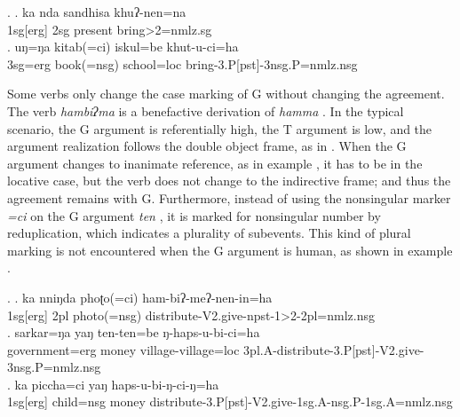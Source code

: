  \ex. \ag. ka nda sandhisa khuʔ-nen=na\\
{\sc 1sg[erg]}  {\sc 2sg}  present{\sc }	bring{>2=nmlz.sg}\\
 	\bg. uŋ=ŋa  kitab(=ci) iskul=be khut-u-ci=ha\\
		 {\sc 3sg=erg}  book{\sc (=nsg)} school{\sc =loc} bring{\sc -3.P[pst]-3nsg.P=nmlz.nsg}\\

	
Some verbs only change  the case marking of G without changing the agreement.  The verb \emph{hambiʔma}  is a benefactive derivation of \emph{hamma} . In the typical scenario, the G argument is referentially high, the T argument is low, and the argument realization follows the double object frame, as in \Next[a]. When the G argument changes to  inanimate reference, as in example \Next[b], it has to  be in the locative case, but the verb does not change to the indirective frame; and thus the agreement remains with G. Furthermore, instead of using the nonsingular marker \emph{=ci} on the G argument \emph{ten} , it is marked for nonsingular number by reduplication, which indicates a plurality of subevents. This kind of plural marking is not encountered when the G argument is human, as shown in example \Next[c].

\ex. \ag. ka nniŋda phoʈo(=ci) ham-biʔ-meʔ-nen-in=ha\\
		{\sc 1sg[erg]} {\sc 2pl} photo{\sc (=nsg)} distribute{\sc -V2.give-npst-1>2-2pl=nmlz.nsg}	\\
 	\bg. sarkar=ŋa yaŋ ten-ten=be ŋ-haps-u-bi-ci=ha\\
	government{\sc =erg} money village-village{\sc =loc}	{\sc 3pl.A-}distribute{\sc -3.P[pst]-V2.give-3nsg.P=nmlz.nsg}\\
		\bg. ka piccha=ci yaŋ haps-u-bi-ŋ-ci-ŋ=ha\\
	{\sc 1sg[erg]}  child{\sc =nsg} money{\sc }	distribute{\sc -3.P[pst]-V2.give-1sg.A-nsg.P-1sg.A=nmlz.nsg}\\

	
